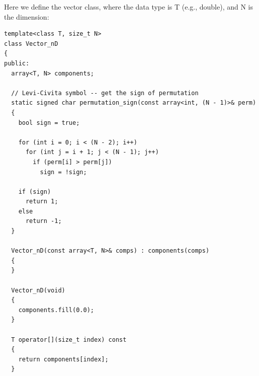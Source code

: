 \documentclass[12pt]{article}
\begin{document}
Here we define the vector class, where the data type is T (e.g., double), and N is the dimension:
\begin{lstlisting}
template<class T, size_t N>
class Vector_nD
{
public:
  array<T, N> components;

  // Levi-Civita symbol -- get the sign of permutation
  static signed char permutation_sign(const array<int, (N - 1)>& perm)
  {
    bool sign = true;

    for (int i = 0; i < (N - 2); i++)
      for (int j = i + 1; j < (N - 1); j++)
        if (perm[i] > perm[j])
          sign = !sign;

    if (sign)
      return 1;
    else
      return -1;
  }

  Vector_nD(const array<T, N>& comps) : components(comps)
  {
  }

  Vector_nD(void)
  {
    components.fill(0.0);
  }

  T operator[](size_t index) const
  {
    return components[index];
  }

\end{lstlisting}
\end{document}
